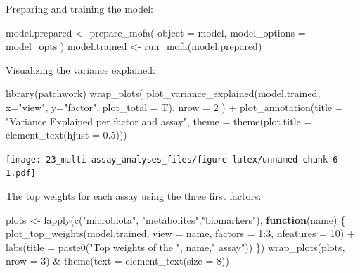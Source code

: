 \documentclass[
]{book}
\newenvironment{Shaded}{\begin{snugshade}}{\end{snugshade}}
\newcommand{\AttributeTok}[1]{\textcolor[rgb]{0.77,0.63,0.00}{#1}}
\newcommand{\ControlFlowTok}[1]{\textcolor[rgb]{0.13,0.29,0.53}{\textbf{#1}}}
\newcommand{\DecValTok}[1]{\textcolor[rgb]{0.00,0.00,0.81}{#1}}
\newcommand{\FloatTok}[1]{\textcolor[rgb]{0.00,0.00,0.81}{#1}}
\newcommand{\FunctionTok}[1]{\textcolor[rgb]{0.00,0.00,0.00}{#1}}
\newcommand{\NormalTok}[1]{#1}
\newcommand{\OtherTok}[1]{\textcolor[rgb]{0.56,0.35,0.01}{#1}}
\newcommand{\SpecialCharTok}[1]{\textcolor[rgb]{0.00,0.00,0.00}{#1}}
\newcommand{\StringTok}[1]{\textcolor[rgb]{0.31,0.60,0.02}{#1}}
\begin{document}
Preparing and training the model:

\begin{Shaded}
\begin{Highlighting}[]
\NormalTok{model.prepared }\OtherTok{\textless{}{-}} \FunctionTok{prepare\_mofa}\NormalTok{(}
  \AttributeTok{object =}\NormalTok{ model,}
  \AttributeTok{model\_options =}\NormalTok{ model\_opts}
\NormalTok{)}
\NormalTok{model.trained }\OtherTok{\textless{}{-}} \FunctionTok{run\_mofa}\NormalTok{(model.prepared)}
\end{Highlighting}
\end{Shaded}

Visualizing the variance explained:

\begin{Shaded}
\begin{Highlighting}[]
\FunctionTok{library}\NormalTok{(patchwork)}
\FunctionTok{wrap\_plots}\NormalTok{(}
    \FunctionTok{plot\_variance\_explained}\NormalTok{(model.trained, }\AttributeTok{x=}\StringTok{"view"}\NormalTok{, }\AttributeTok{y=}\StringTok{"factor"}\NormalTok{, }\AttributeTok{plot\_total =}\NormalTok{ T),}
    \AttributeTok{nrow =} \DecValTok{2}
\NormalTok{) }\SpecialCharTok{+} \FunctionTok{plot\_annotation}\NormalTok{(}\AttributeTok{title =} \StringTok{"Variance Explained per factor and assay"}\NormalTok{,}
                    \AttributeTok{theme =} \FunctionTok{theme}\NormalTok{(}\AttributeTok{plot.title =} \FunctionTok{element\_text}\NormalTok{(}\AttributeTok{hjust =} \FloatTok{0.5}\NormalTok{)))}
\end{Highlighting}
\end{Shaded}

\texttt{[image: 23\_multi-assay\_analyses\_files/figure-latex/unnamed-chunk-6-1.pdf]}

The top weights for each assay using the three first factors:

\begin{Shaded}
\begin{Highlighting}[]
\NormalTok{plots }\OtherTok{\textless{}{-}} \FunctionTok{lapply}\NormalTok{(}\FunctionTok{c}\NormalTok{(}\StringTok{"microbiota"}\NormalTok{, }\StringTok{"metabolites"}\NormalTok{,}\StringTok{"biomarkers"}\NormalTok{), }\ControlFlowTok{function}\NormalTok{(name) \{}
    \FunctionTok{plot\_top\_weights}\NormalTok{(model.trained,}
                     \AttributeTok{view =}\NormalTok{ name,}
                     \AttributeTok{factors =} \DecValTok{1}\SpecialCharTok{:}\DecValTok{3}\NormalTok{,}
                     \AttributeTok{nfeatures =} \DecValTok{10}\NormalTok{) }\SpecialCharTok{+}
        \FunctionTok{labs}\NormalTok{(}\AttributeTok{title =} \FunctionTok{paste0}\NormalTok{(}\StringTok{"Top weights of the "}\NormalTok{, name,}\StringTok{" assay"}\NormalTok{))}
\NormalTok{\})}
\FunctionTok{wrap\_plots}\NormalTok{(plots, }\AttributeTok{nrow =} \DecValTok{3}\NormalTok{) }\SpecialCharTok{\&} \FunctionTok{theme}\NormalTok{(}\AttributeTok{text =} \FunctionTok{element\_text}\NormalTok{(}\AttributeTok{size =} \DecValTok{8}\NormalTok{))}
\end{Highlighting}
\end{Shaded}
\end{document}
